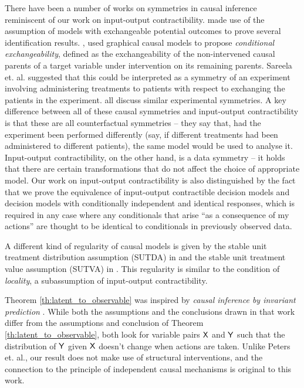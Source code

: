 \documentclass{article}
\begin{document}
There have been a number of works on symmetries in causal inference reminiscent of our work on input-output contractibility. \citet{rubin_causal_2005, imbens_causal_2015} made use of the assumption of models with exchangeable potential outcomes to prove several identification results. \citet{saarela_role_2020}, used graphical causal models to propose \emph{conditional exchangeability}, defined as the exchangeability of the non-intervened causal parents of a target variable under intervention on its remaining parents. Sareela et. al. suggested that this could be interpreted as a symmetry of an experiment involving administering treatments to patients with respect to exchanging the patients in the experiment. \citet{hernan_estimating_2006,hernan_beyond_2012,greenland_identifiability_1986,banerjee_chapter_2017,dawid_decision-theoretic_2020} all discuss similar experimental symmetries. A key difference between all of these causal symmetries and input-output contractibility is that these are all counterfactual symmetries -- they say that, had the experiment been performed differently (say, if different treatments had been administered to different patients), the same model would be used to analyse it. Input-output contractibility, on the other hand, is a data symmetry -- it holds that there are certain transformations that do not affect the choice of appropriate model. Our work on input-output contractibility is also distinguished by the fact that we prove the equivalence of input-output contractible decision models and decision models with conditionally independent and identical responses, which is required in any case where any conditionals that arise ``as a consequence of my actions'' are thought to be identical to conditionals in previously observed data.

A different kind of regularity of causal models is given by the stable unit treatment distribution assumption (SUTDA) in \citet{dawid_decision-theoretic_2020} and the stable unit treatment value assumption (SUTVA) in \citep{rubin_causal_2005}. This regularity is similar to the condition of \emph{locality}, a subassumption of input-output contractibility.

Theorem \ref{th:latent_to_observable} was inspired by \emph{causal inference by invariant prediction} \citep{peters_causal_2016}. While both the assumptions and the conclusions drawn in that work differ from the assumptions and conclusion of Theorem \ref{th:latent_to_observable}, both look for variable pairs $\mathsf{X}$ and $\mathsf{Y}$ such that the distribution of $\mathsf{Y}$ given $\mathsf{X}$ doesn't change when actions are taken. Unlike Peters et. al., our result does not make use of structural interventions, and the connection to the principle of independent causal mechanisms is original to this work.
\end{document}
